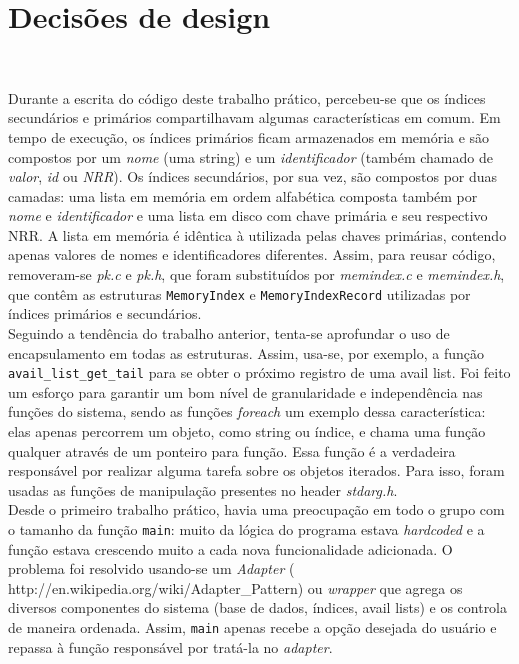 \documentclass{article}
\begin{document}
\section{Decisões de design}\

Durante a escrita do código deste trabalho prático, percebeu-se que os índices secundários e primários compartilhavam algumas características em comum. Em tempo de execução, os índices primários ficam armazenados em memória e são compostos por um \textit{nome} (uma string) e um \textit{identificador} (também chamado de \textit{valor}, \textit{id} ou \textit{NRR}). Os índices secundários, por sua vez, são compostos por duas camadas: uma lista em memória em ordem alfabética composta também por \textit{nome} e \textit{identificador} e uma lista em disco com chave primária e seu respectivo NRR. A lista em memória é idêntica à utilizada pelas chaves primárias, contendo apenas valores de nomes e identificadores diferentes. Assim, para reusar código, removeram-se \textit{pk.c} e \textit{pk.h}, que foram substituídos por \textit{memindex.c} e \textit{memindex.h}, que contêm as estruturas \texttt{MemoryIndex} e \texttt{MemoryIndexRecord} utilizadas por índices primários e secundários.\\

Seguindo a tendência do trabalho anterior, tenta-se aprofundar o uso de encapsulamento em todas as estruturas. Assim, usa-se, por exemplo, a função \texttt{avail\_list\_get\_tail} para se obter o próximo registro de uma avail list. Foi feito um esforço para garantir um bom nível de granularidade e independência nas funções do sistema, sendo as funções \textit{foreach} um exemplo dessa característica: elas apenas percorrem um objeto, como string ou índice, e chama uma função qualquer através de um ponteiro para função. Essa função é a verdadeira responsável por realizar alguma tarefa sobre os objetos iterados. Para isso, foram usadas as funções de manipulação presentes no header \textit{stdarg.h}.\\

Desde o primeiro trabalho prático, havia uma preocupação em todo o grupo com o tamanho da função \texttt{main}: muito da lógica do programa estava \textit{hardcoded} e a função estava crescendo muito a cada nova funcionalidade adicionada. O problema foi resolvido usando-se um \textit{Adapter} (        http://en.wikipedia.org/wiki/Adapter\_Pattern) ou \textit{wrapper} que agrega os diversos componentes do sistema (base de dados, índices, avail lists) e os controla de maneira ordenada. Assim, \texttt{main} apenas recebe a opção desejada do usuário e repassa à função responsável por tratá-la no \textit{adapter}.
\end{document}
